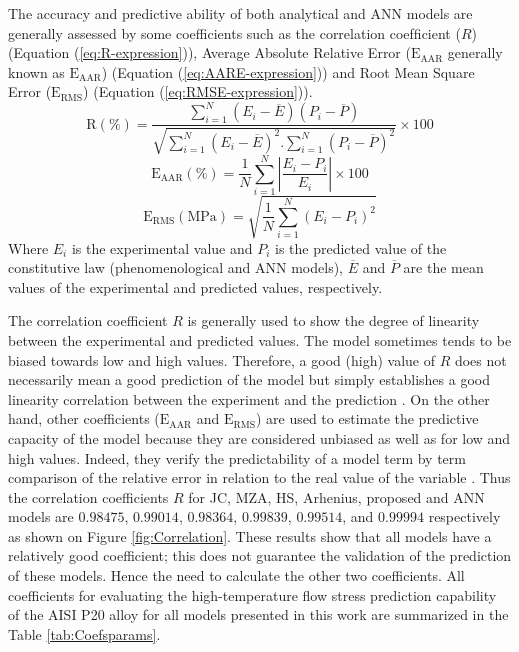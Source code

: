 \documentclass[twoside,english,1p,final,sort&compress]{elsarticle}
\theoremstyle{plain}
\newcommand{\RMSE}{\text{E}_\text{RMS}}
\newcommand{\AARE}{\text{E}_\text{AAR}}
\newcommand{\R}{\text{R}}
\begin{document}
The accuracy and predictive ability of both analytical and ANN models are generally assessed by some coefficients such as the correlation coefﬁcient ($R$) (Equation (\ref{eq:R-expression})), Average Absolute Relative Error ($\AARE$ generally known as $\AARE$) (Equation (\ref{eq:AARE-expression})) and Root Mean Square Error ($\RMSE$) (Equation (\ref{eq:RMSE-expression})).
\begin{equation}
\label{eq:R-expression}
\R(\%) = \frac{\displaystyle\sum_{i=1}^{N}{\left(E_i - \overline{E}\right)\left(P_i - \overline{P}\right)}}{\sqrt{\displaystyle\sum_{i=1}^{N}\left(E_i - \overline{E}\right)^2 .\displaystyle\sum_{i=1}^{N}\left(P_i - \overline{P}\right)^2}}\times 100
\end{equation}
\begin{equation}
\label{eq:AARE-expression}
\AARE(\%) = \frac{1}{N}\displaystyle\sum_{i=1}^{N} \displaystyle\left\lvert\frac{E_i- P_i}{E_i} \right\rvert\times 100
\end{equation}
\begin{equation}
\label{eq:RMSE-expression}
\RMSE (\text{MPa}) = \sqrt{\frac{1}{N} \displaystyle\sum_{i=1}^{N} \left(E_i - P_i\right)^2}
\end{equation}
Where $E_i$ is the experimental value and $P_i$ is the predicted value of the constitutive law (phenomenological and ANN models), $\overline{E}$ and $\overline{P}$ are the mean values of the experimental and predicted values, respectively.

The correlation coefficient $R$ is generally used to show the degree of linearity between the experimental and predicted values.
The model sometimes tends to be biased towards low and high values.
Therefore, a good (high) value of $R$ does not necessarily mean a good prediction of the model but simply establishes a good linearity correlation between the experiment and the prediction \cite{Phaniraj-2003}.
On the other hand, other coefficients ($\AARE$ and $\RMSE$) are used to estimate the predictive capacity of the model because they are considered unbiased as well as for low and high values.
Indeed, they verify the predictability of a model term by term comparison of the relative error in relation to the real value of the variable \cite{Srinivasulu-2006}.
Thus the correlation coefficients $R$ for JC, MZA, HS, Arhenius, proposed and ANN models are $0.98475$,  $0.99014$,  $0.98364$, $0.99839$, $0.99514$, and $0.99994$ respectively as shown on Figure \ref{fig:Correlation}.
These results show that all models have a relatively good coefficient; this does not guarantee the validation of the prediction of these models.
Hence the need to calculate the other two coefficients.
All coefficients for evaluating the high-temperature flow stress prediction capability of the AISI P20 alloy for all models presented in this work are summarized in the Table \ref{tab:Coefsparams}.
\end{document}
